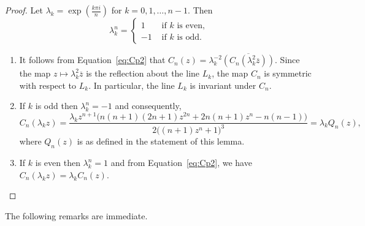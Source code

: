 \documentclass[12pt]{article}
\begin{document}
\begin{proof}
	Let $\lambda_{k} = \exp\left(\frac{k\pi i}{n}\right)$ for $k = 0, 1, \dots, n-1$. Then
	$$
	\lambda_{k}^{n}= \left\{\begin{array}{ccc}
		1 & \text { if } k \text { is even}, \\
		-1 & \text { if } k \text { is odd}.
	\end{array}\right.
	$$
	\begin{enumerate}
		\item 	It follows from Equation~\eqref{eq:Cp2} that $C_n (z)=\lambda_k ^{-2} \overline{(C_n (\lambda_k ^2 \overline{z}))}$. Since the map $z \mapsto \lambda_k ^2 \overline{z}$ is the reflection about the line $L_k$, the map $C_n$ is symmetric with respect to $L_k$. In particular, the line $L_k$ is invariant under $C_n$. 
	
		\item If $k$ is odd then $\lambda_k ^n =-1$ and consequently, 	$$
		C_{n}(\lambda_{k}z) = \frac{\lambda_{k}z^{n+1} \big(n(n+1)(2n+1)z^{2n} + 2n(n+1)z^{n} - n(n-1)\big)}{2\big((n+1)z^{n} + 1\big)^3} = \lambda_{k} Q_n(z),
		$$
		where		
		$ Q_n(z) $ is as defined in the statement of this lemma.
			\item If $k$ is even then $\lambda_k ^n =1$ and from Equation~\eqref{eq:Cp2}, we have   $C_{n}(\lambda_{k} z) = \lambda_{k} C_{n}(z).$ 
	\end{enumerate}	 
\end{proof}

 The following remarks are immediate.
\end{document}
